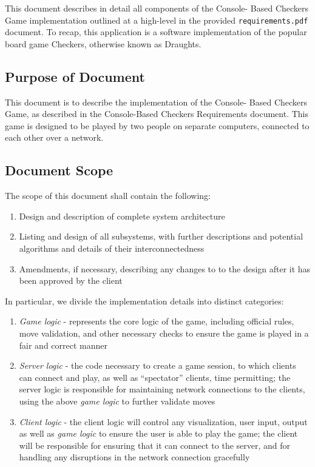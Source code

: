 \documentclass[letterpaper]{article}
\begin{document}
This document describes in detail all components of the Console-
Based Checkers Game implementation outlined at a high-level in
the provided \texttt{requirements.pdf} document. To recap, this
application is a software implementation of the popular board
game Checkers, otherwise known as Draughts.

\subsection{Purpose of Document}
\label{sec:intro_outline}

This document is to describe the implementation of the Console-
Based Checkers Game, as described in the Console-Based Checkers
Requirements document. This game is designed to be played by 
two people on separate computers, connected to each other over
a network.

\subsection{Document Scope}
\label{sec:intro_scope}

The scope of this document shall contain the following:

\begin{enumerate}
    \item Design and description of complete system architecture
    \item Listing and design of all subsystems, with further
          descriptions and potential algorithms and details of
          their interconnectedness
    \item Amendments, if necessary, describing any changes to
          to the design after it has been approved by the client
\end{enumerate}

In particular, we divide the implementation details into
distinct categories:

\begin{enumerate}
    \item \emph{Game logic} - represents the core logic of the
          game, including official rules, move validation, and
          other necessary checks to ensure the game is played in
          a fair and correct manner
    \item \emph{Server logic} - the code necessary to create a
          game session, to which clients can connect and play,
          as well as ``spectator'' clients, time permitting; the
          server logic is responsible for maintaining network
          connections to the clients, using the above
          \emph{game logic} to further validate moves
    \item \emph{Client logic} - the client logic will control
          any visualization, user input, output as well as
          \emph{game logic} to ensure the user is able to play
          the game; the client will be responsible for ensuring
          that it can connect to the server, and for handling
          any disruptions in the network connection gracefully
\end{enumerate}
\end{document}
